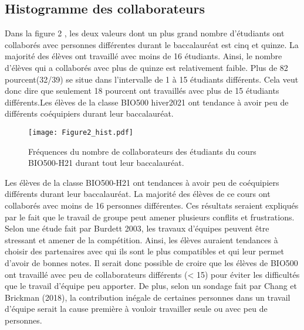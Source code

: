 \documentclass[12pt]{article}
\begin{document}
\begin{multicols}{2}
\subsection{Histogramme des collaborateurs}
Dans la figure 2 , les deux valeurs dont un plus grand nombre d’étudiants ont collaborés avec personnes différentes durant le baccalauréat est cinq et quinze. La majorité des élèves ont travaillé avec moins de 16 étudiants. Ainsi, le nombre d’élèves qui a collaborés avec plus de quinze est relativement faible. Plus de 82 pourcent(32/39) se situe dans l’intervalle de 1 à 15 étudiants différents. Cela veut donc dire que seulement 18 pourcent ont travaillés avec plus de 15 étudiants différents.Les élèves de la classe BIO500 hiver2021 ont tendance à avoir peu de différents coéquipiers durant leur baccalauréat. 
\begin{figure}[H]
\centering
\texttt{[image: Figure2\_hist.pdf]}
\caption{Fréquences du nombre de collaborateurs des étudiants du cours BIO500-H21 durant tout leur baccalauréat.}
\label{fig2}
\end{figure}
Les élèves de la classe BIO500-H21 ont tendances à avoir peu de coéquipiers différents durant leur baccalauréat. La majorité des élèves de ce cours ont collaborés avec moins de 16 personnes différentes. Ces résultats seraient expliqués par le fait que le travail de groupe peut amener plusieurs conflits et frustrations\cite{Boud1999}. Selon une étude fait par Burdett 2003\cite{Burdett2003}, les travaux d’équipes peuvent être stressant et amener de la compétition. Ainsi, les élèves auraient tendances à choisir des partenaires avec qui ils sont le plus compatibles et qui leur permet d’avoir de bonnes notes. Il serait donc possible de croire que les élèves de BIO500 ont travaillé avec peu de collaborateurs différents (< 15) pour éviter les difficultés que le travail d’équipe peu apporter. De plus, selon un sondage fait par Chang et Brickman (2018)\cite{Chang2018}, la contribution inégale de certaines personnes dans un travail d’équipe serait la cause première à vouloir travailler seule ou avec peu de personnes. 


\end{multicols}
\end{document}
